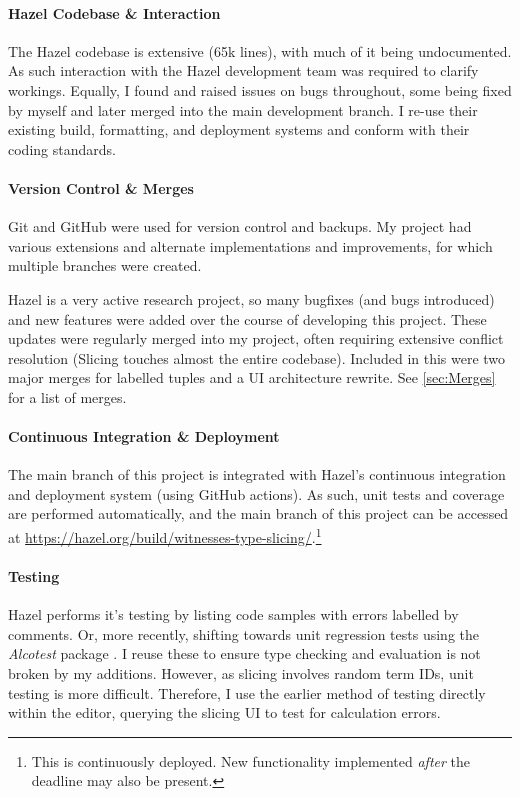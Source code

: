 \paragraph{Hazel Codebase \& Interaction} The Hazel codebase is extensive (65k lines), with much of it being undocumented. As such interaction with the Hazel development team was required to clarify workings. Equally, I found and raised issues on bugs throughout, some being fixed by myself and later merged into the main development branch. I re-use their existing build, formatting, and deployment systems and conform with their coding standards. 
\paragraph{Version Control \& Merges} Git and GitHub were used for version control and backups. My project had various extensions and alternate implementations and improvements, for which multiple branches were created.

Hazel is a very active research project, so many bugfixes (and bugs introduced) and new features were added over the course of developing this project. These updates were regularly merged into my project, often requiring extensive conflict resolution (Slicing touches almost the entire codebase). Included in this were two major merges for labelled tuples and a UI architecture rewrite. See \cref{sec:Merges} for a list of merges.
\paragraph{Continuous Integration \& Deployment} The main branch of this project is integrated with Hazel's continuous integration and deployment system (using GitHub actions). As such, unit tests and coverage are performed automatically, and the main branch of this project can be accessed at \url{https://hazel.org/build/witnesses-type-slicing/}.\footnote{This is continuously deployed. New functionality implemented \textit{after} the deadline may also be present.}
\paragraph{Testing} Hazel performs it's testing by listing code samples with errors labelled by comments. Or, more recently, shifting towards unit regression tests using the \textit{Alcotest} package \cite{AlcoTest}. I reuse these to ensure type checking and evaluation is not broken by my additions. However, as slicing involves random term IDs, unit testing is more difficult. Therefore, I use the earlier method of testing directly within the editor, querying the slicing UI to test for calculation errors.
